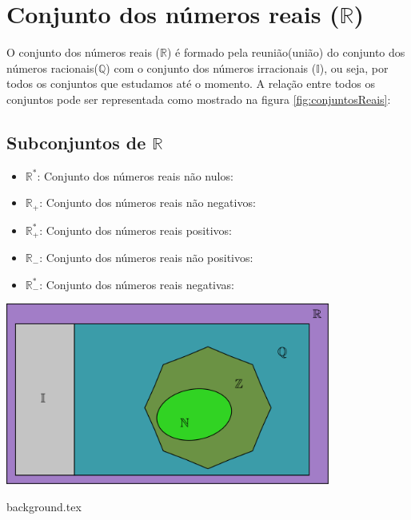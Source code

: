 \documentclass[10pt]{article}
\begin{document}
\section*{Conjunto dos números reais (\( \mathbb{R} \))}
O conjunto dos números reais (\( \mathbb{R} \)) é formado pela reunião(união) do conjunto dos números racionais(\( \mathbb{Q}\)) com o conjunto dos números irracionais (\( \mathbb{I}\)), ou seja, por todos os conjuntos que estudamos até o momento. A relação entre todos os conjuntos pode ser representada como mostrado na figura \ref{fig:conjuntosReais}:
\begin{multicols}{2}
\subsection*{Subconjuntos de \(\mathbb{R}\)}
\begin{itemize}
        \item \( \mathbb{R}^* \): Conjunto dos números reais não nulos:
        \item \( \mathbb{R}_+ \): Conjunto dos números reais não negativos:
        \item \( \mathbb{R}^*_+ \): Conjunto dos números reais positivos:
        \item  \( \mathbb{R}_- \): Conjunto dos números reais não positivos:
        \item  \( \mathbb{R}^*_- \): Conjunto dos números reais negativas:
    \end{itemize}
\columnbreak
\bigskip
\noindent
    \begin{minipage}{\linewidth}
        \centering 
        \includegraphics[width=0.8\textwidth]{imgs/conjuntosNumerico/conjuntosReais.pdf}
        \label{fig:conjuntosReais} 
    \end{minipage}%
\end{multicols} 
\newpage
{background.tex} %
\end{document}
